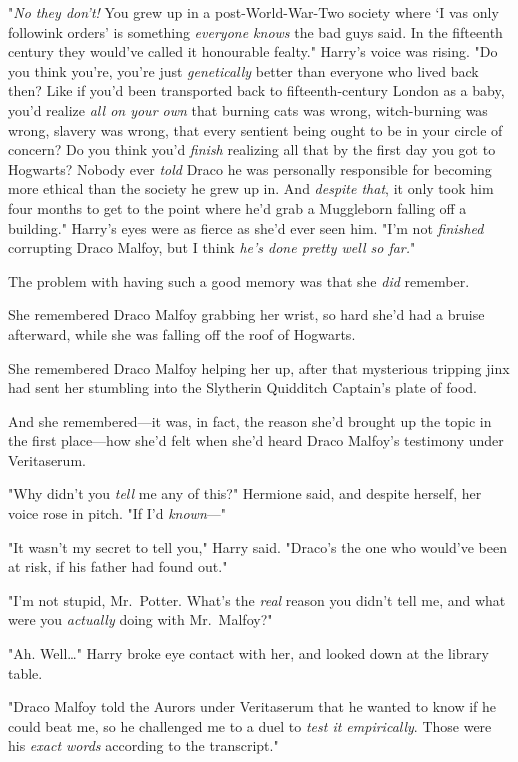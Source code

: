 "\emph{No they don't!} You grew up in a post-World-War-Two society where `I vas 
only followink orders' is something \emph{everyone knows} the bad guys said. In 
the fifteenth century they would've called it honourable fealty." Harry's voice 
was rising. "Do you think you're, you're just \emph{genetically} better than 
everyone who lived back then? Like if you'd been transported back to 
fifteenth-century London as a baby, you'd realize \emph{all on your own} that 
burning cats was wrong, witch-burning was wrong, slavery was wrong, that every 
sentient being ought to be in your circle of concern? Do you think you'd 
\emph{finish} realizing all that by the first day you got to Hogwarts? Nobody 
ever \emph{told} Draco he was personally responsible for becoming more ethical 
than the society he grew up in. And \emph{despite that}, it only took him four 
months to get to the point where he'd grab a Muggleborn falling off a 
building." Harry's eyes were as fierce as she'd ever seen him. "I'm not 
\emph{finished} corrupting Draco Malfoy, but I think \emph{he's done pretty 
well so far.}"

The problem with having such a good memory was that she \emph{did} remember.

She remembered Draco Malfoy grabbing her wrist, so hard she'd had a bruise 
afterward, while she was falling off the roof of Hogwarts.

She remembered Draco Malfoy helping her up, after that mysterious tripping jinx 
had sent her stumbling into the Slytherin Quidditch Captain's plate of food.

And she remembered---it was, in fact, the reason she'd brought up the topic in 
the first place---how she'd felt when she'd heard Draco Malfoy's testimony 
under Veritaserum.

"Why didn't you \emph{tell} me any of this?" Hermione said, and despite 
herself, her voice rose in pitch. "If I'd \emph{known}---"

"It wasn't my secret to tell you," Harry said. "Draco's the one who would've 
been at risk, if his father had found out."

"I'm not stupid, Mr.~Potter. What's the \emph{real} reason you didn't tell me, 
and what were you \emph{actually} doing with Mr.~Malfoy?"

"Ah. Well{\ldots}" Harry broke eye contact with her, and looked down at the 
library table.

"Draco Malfoy told the Aurors under Veritaserum that he wanted to know if he 
could beat me, so he challenged me to a duel to \emph{test it empirically}. 
Those were his \emph{exact words} according to the transcript."

